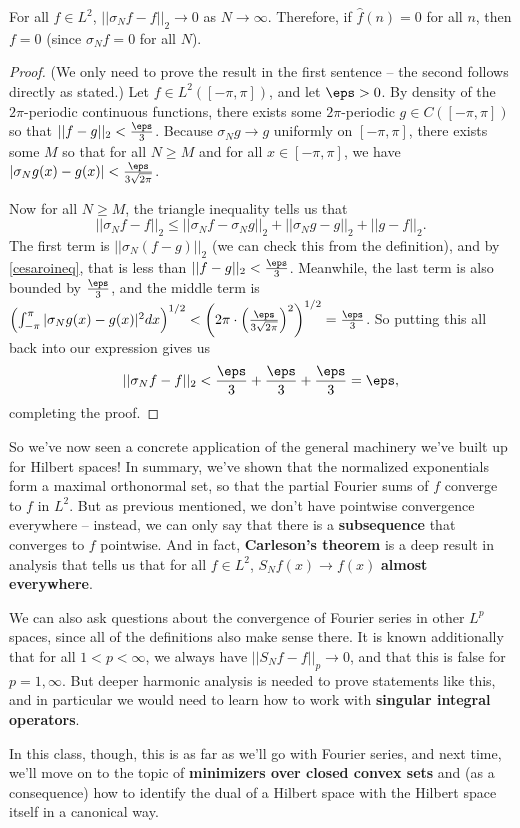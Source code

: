 \begin{theorem}
For all $f \in L^2$, $||\sigma_N f - f||_2 \to 0$ as $N \to \infty$. Therefore, if $\hat{f}(n) = 0$ for all $n$, then $f = 0$ (since $\sigma_N f = 0$ for all $N$).
\end{theorem}
\begin{proof}
(We only need to prove the result in the first sentence -- the second follows directly as stated.) Let $f \in L^2([-\pi, \pi])$, and let $\eps > 0$. By density of the $2\pi$-periodic continuous functions, there exists some $2\pi$-periodic $g \in C([-\pi, \pi])$ so that $||f-g||_2 < \frac{\eps}{3}$. Because $\sigma_N g \to g$ uniformly on $[-\pi, \pi]$, there exists some $M$ so that for all $N \ge M$ and for all $x \in [-\pi, \pi]$, we have $|\sigma_Ng(x) - g(x)| < \frac{\eps}{3\sqrt{2\pi}}$.  

Now for all $N \ge M$, the triangle inequality tells us that
\[
    ||\sigma_Nf - f||_2 \le ||\sigma_N f - \sigma_N g||_2 + ||\sigma_N g - g||_2 + ||g - f||_2.
\]
The first term is $||\sigma_N(f-g)||_2$ (we can check this from the definition), and by \cref{cesaroineq}, that is less than $||f-g||_2 < \frac{\eps}{3}$. Meanwhile, the last term is also bounded by $\frac{\eps}{3}$, and the middle term is $\left(\int_{-\pi}^{\pi} |\sigma_N g(x) - g(x) |^2 dx \right)^{1/2} < \left(2\pi \cdot\left(\frac{\eps}{3\sqrt{2\pi}}\right)^2\right)^{1/2} = \frac{\eps}{3}$. So putting this all back into our expression gives us
\[
     ||\sigma_Nf - f||_2 < \frac{\eps}{3} + \frac{\eps}{3} + \frac{\eps}{3} = \eps,
\]
completing the proof.
\end{proof}

So we've now seen a concrete application of the general machinery we've built up for Hilbert spaces! In summary, we've shown that the normalized exponentials form a maximal orthonormal set, so that the partial Fourier sums of $f$ converge to $f$ in $L^2$. But as previous mentioned, we don't have pointwise convergence everywhere -- instead, we can only say that there is a \textbf{subsequence} that converges to $f$ pointwise. And in fact, \textbf{Carleson's theorem }is a deep result in analysis that tells us that for all $f \in L^2$, $S_Nf(x) \to f(x)$ \textbf{almost everywhere}.

We can also ask questions about the convergence of Fourier series in other $L^p$ spaces, since all of the definitions also make sense there. It is known additionally that for all $1 < p < \infty$, we always have $||S_N f - f||_p \to 0$, and that this is false for $p = 1, \infty$. But deeper harmonic analysis is needed to prove statements like this, and in particular we would need to learn how to work with \textbf{singular integral operators}.

In this class, though, this is as far as we'll go with Fourier series, and next time, we'll move on to the topic of \textbf{minimizers over closed convex sets} and (as a consequence) how to identify the dual of a Hilbert space with the Hilbert space itself in a canonical way. 